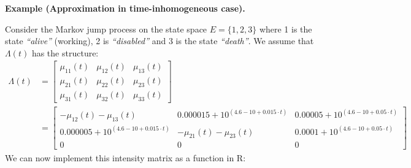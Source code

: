 \documentclass[
]{book}
\begin{document}
\textbf{Example (Approximation in time-inhomogeneous case).}

Consider the Markov jump process on the state space \(E=\{1,2,3\}\) where 1 is the state \emph{``alive''} (working), 2 is \emph{``disabled''} and 3 is the state \emph{``death''}. We assume that \(\Lambda(t)\) has the structure:
\begin{align*}
\Lambda(t)&=\begin{bmatrix}
\mu_{11}(t) & \mu_{12}(t) & \mu_{13}(t)\\
\mu_{21}(t) & \mu_{22}(t) & \mu_{23}(t)\\
\mu_{31}(t) & \mu_{32}(t) & \mu_{33}(t)
\end{bmatrix}\\
&=
\begin{bmatrix}
-\mu_{12}(t)-\mu_{13}(t) &  0.000015 + 10^{(4.6-10+0.015\cdot t)} & 0.00005 + 10^{(4.6-10+0.05\cdot t)}\\
0.000005 + 10^{(4.6-10+0.015\cdot t)} & -\mu_{21}(t)-\mu_{23}(t) & 0.0001 + 10^{(4.6-10+0.05\cdot t)}\\
0 & 0 & 0
\end{bmatrix}
\end{align*}
We can now implement this intensity matrix as a function in R:
\end{document}
